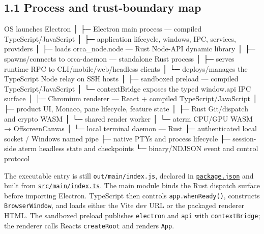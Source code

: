 \documentclass[
  10pt,
  letterpaper,
]{article}
\newenvironment{Shaded}{\begin{snugshade}}{\end{snugshade}}
\newcommand{\NormalTok}[1]{#1}
\begin{document}
\subsection{1.1 Process and trust-boundary
map}\label{11-process-and-trust-boundary-map}

\begin{Shaded}
\begin{Highlighting}[]
\NormalTok{OS launches Electron}
\NormalTok{│}
\NormalTok{├─ Electron main process — compiled TypeScript/JavaScript}
\NormalTok{│  ├─ application lifecycle, windows, IPC, services, providers}
\NormalTok{│  ├─ loads orca\_node.node — Rust Node{-}API dynamic library}
\NormalTok{│  ├─ spawns/connects to orca{-}daemon — standalone Rust process}
\NormalTok{│  ├─ serves runtime RPC to CLI/mobile/web/headless clients}
\NormalTok{│  └─ deploys/manages the TypeScript Node relay on SSH hosts}
\NormalTok{│}
\NormalTok{├─ sandboxed preload — compiled TypeScript/JavaScript}
\NormalTok{│  └─ contextBridge exposes the typed window.api IPC surface}
\NormalTok{│}
\NormalTok{├─ Chromium renderer — React + compiled TypeScript/JavaScript}
\NormalTok{│  ├─ product UI, Monaco, pane lifecycle, feature state}
\NormalTok{│  ├─ Rust Git/dispatch and crypto WASM}
\NormalTok{│  └─ shared render worker}
\NormalTok{│     └─ aterm CPU/GPU WASM → OffscreenCanvas}
\NormalTok{│}
\NormalTok{└─ local terminal daemon — Rust}
\NormalTok{   ├─ authenticated local socket / Windows named pipe}
\NormalTok{   ├─ native PTYs and process lifecycle}
\NormalTok{   ├─ session{-}side aterm headless state and checkpoints}
\NormalTok{   └─ binary/NDJSON event and control protocol}
\end{Highlighting}
\end{Shaded}

The executable entry is still \texttt{out/main/index.js}, declared in
\href{https://github.com/andrewyatesai/orca-alab/blob/d3ba1bcb17324714a838b2970e04fcd96989e84f/package.json\#L11}{\texttt{package.json}}
and built from
\href{https://github.com/andrewyatesai/orca-alab/blob/d3ba1bcb17324714a838b2970e04fcd96989e84f/src/main/index.ts\#L1}{\texttt{src/main/index.ts}}.
The main module binds the Rust dispatch surface before importing
Electron. TypeScript then controls \texttt{app.whenReady()}, constructs
\texttt{BrowserWindow}, and loads either the Vite dev URL or the
packaged renderer HTML. The sandboxed preload publishes
\texttt{electron} and \texttt{api} with \texttt{contextBridge}; the
renderer calls React\textquotesingle s \texttt{createRoot} and renders
\texttt{App}.
\end{document}
